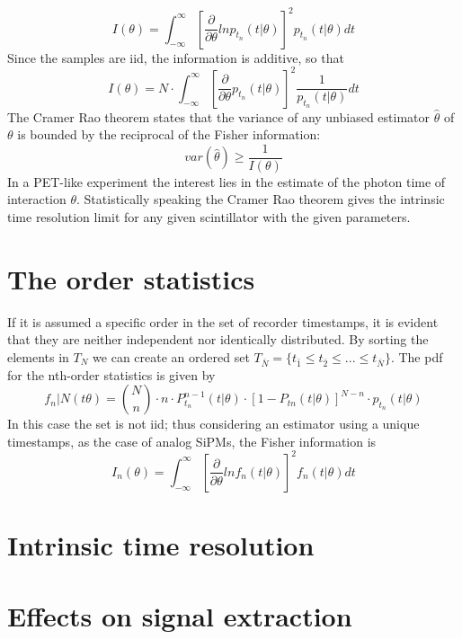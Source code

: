 \begin{equation}
I(\theta) = \int _{-\infty} ^{\infty} \left[ \frac{\partial}{\partial \theta} ln p_{t_{n}}(t|\theta) \right] ^{2} p_{t_{n}}(t|\theta)dt
\end{equation}
Since the samples are iid, the information is additive, so that
\begin{equation}
I(\theta) = N \cdot \int _{-\infty} ^{\infty} \left[ \frac{\partial}{\partial \theta} p_{t_{n}}(t|\theta) \right] ^{2} \frac{1}{p_{t_{n}}(t|\theta)}dt
\end{equation}
The Cramer Rao theorem states that the variance of any unbiased estimator $\hat{\theta}$ of $\theta$ is bounded by the reciprocal of the Fisher information:
\begin{equation}
var(\hat{\theta})\geq \frac{1}{I(\theta)}
\end{equation}
In a PET-like experiment the interest lies in the estimate of the photon time of interaction $\theta$.
Statistically speaking the Cramer Rao theorem gives the intrinsic time resolution limit for any given scintillator with the given parameters.

\section{The order statistics}
If it is assumed a specific order in the set of recorder timestamps, it is evident that they are neither independent nor identically distributed. By sorting the elements in $T_{N}$ we can create an ordered set $T_{\bar{N}} = \{ t_{\bar{1}} \leq t_{\bar{2}} \leq ... \leq t_{\bar{N}} \}$. The pdf for the nth-order statistics is given by\cite{Seifert2012}
\begin{equation}
f_{n}|N (t\theta) = \binom{N}{n} \cdot n \cdot P_{t_{n}}^{n-1}(t|\theta) \cdot \left[ 1-P_{t{n}}(t|\theta) \right] ^{N-n}\cdot p_{t_{n}} (t|\theta)
\end{equation}
In this case the set is not iid; thus considering an estimator using a unique timestamps, as the case of analog SiPMs, the Fisher information is
\begin{equation}
I_{n}(\theta) = \int _{-\infty} ^{\infty} \left[ \frac{\partial}{\partial \theta} ln f_{n}(t|\theta) \right] ^{2} f_{n}(t|\theta)dt
\end{equation}
   
\section{Intrinsic time resolution}


\section{Effects on signal extraction}

